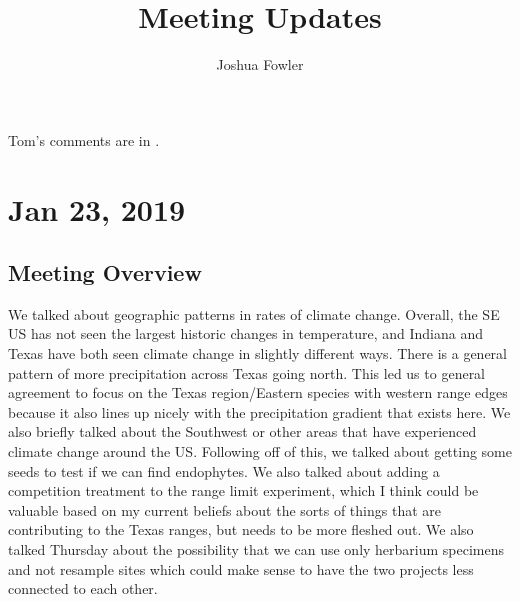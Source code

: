 \documentclass{article}
\title{Meeting Updates}
\author{Joshua Fowler}
\newcommand{\tom}[1]{{\textit{\color{WildStrawberry}{[#1]}}}}
\begin{document}
%
  \maketitle
  Tom's comments are in \tom{WildStrawberry}.

\section*{Jan 23, 2019}
\subsection*{Meeting Overview}
We talked about geographic patterns in rates of climate change. Overall, the SE US has not seen the largest historic changes in temperature, and Indiana and Texas have both seen climate change in slightly different ways. There is a general pattern of more precipitation across Texas going north. This led us to general agreement to focus on the Texas region/Eastern species with western range edges because it also lines up nicely with the precipitation gradient that exists here. We also briefly talked about the Southwest or other areas that have experienced climate change around the US. Following off of this, we talked about getting some seeds to test if we can find endophytes. We also talked about adding a competition treatment to the range limit experiment, which I think could be valuable based on my current beliefs about the sorts of things that are contributing to the Texas ranges, but needs to be more fleshed out. We also talked Thursday about the possibility that we can use only herbarium specimens and not resample sites which could make sense to have the two projects less connected to each other.
\end{document}
